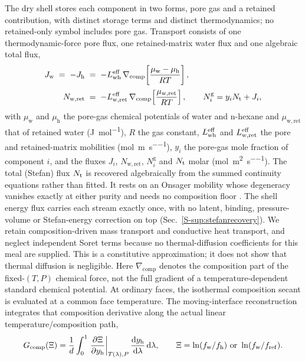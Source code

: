 The dry shell stores each component in two forms, pore gas and a retained
contribution, with distinct storage terms and distinct thermodynamics; no
retained-only symbol includes pore gas. Transport
consists of one thermodynamic-force pore flux, one retained-matrix water flux and one
algebraic total flux,
\begin{align}
J_{\mathrm{w}} \;=\; -J_{\mathrm{h}}
 &\;=\; -L_{\mathrm{wh}}^{\mathrm{eff}}\,\nabla_{\mathrm{comp}}\!\left[\frac{\mu_{\mathrm{w}}-\mu_{\mathrm{h}}}{RT}\right],
\label{eq:binaryflux}\\[2pt]
N_{\mathrm{w,ret}}
 &\;=\; -L_{\mathrm{w,ret}}^{\mathrm{eff}}\,\nabla_{\mathrm{comp}}\!\left[\frac{\mu_{\mathrm{w,ret}}}{RT}\right],
\qquad
N_{i}^{\mathrm{g}} = y_{i}N_{\mathrm{t}} + J_{i} ,
\label{eq:retflux}
\end{align}
with $\mu_{\mathrm{w}}$ and $\mu_{\mathrm{h}}$ the pore-gas chemical potentials
of water and n-hexane and $\mu_{\mathrm{w,ret}}$ that of retained water
(\si{\joule\per\mole}), $R$ the gas constant, $L_{\mathrm{wh}}^{\mathrm{eff}}$ and $L_{\mathrm{w,ret}}^{\mathrm{eff}}$ the pore and
retained-matrix mobilities (\si{\mole\per\meter\per\second}), $y_{i}$ the
pore-gas mole fraction of component $i$, and the fluxes $J_{i}$,
$N_{\mathrm{w,ret}}$, $N_{i}^{\mathrm{g}}$ and $N_{\mathrm{t}}$ molar
(\si{\mole\per\meter\squared\per\second}). The total (Stefan) flux $N_{\mathrm{t}}$ is recovered algebraically from the summed
continuity equations rather than fitted. It rests on an Onsager mobility whose
degeneracy vanishes exactly at either purity and needs no composition floor
\citep{krishna1997maxwell}. The shell energy flux carries each stream exactly
once, with no latent, binding, pressure-volume or Stefan-energy correction on
top (Sec.~\ref*{S-sup:stefanrecovery}). We retain composition-driven mass transport and conductive heat transport,
and neglect independent Soret terms because no thermal-diffusion
coefficients for this meal are supplied. This is a constitutive approximation;
it does not show that thermal diffusion is negligible. Here $\nabla_{\mathrm{comp}}$ denotes the composition part of the
fixed-$(T,P)$ chemical force, not the full gradient of a temperature-dependent
standard chemical potential. At ordinary faces, the isothermal
composition secant is evaluated at a common face temperature. The moving-interface
reconstruction integrates that composition derivative along the actual
linear temperature/composition path,
\begin{equation}
G_{\mathrm{comp}}(\Xi)=\frac{1}{d}\int_0^1
\left.\frac{\partial\Xi}{\partial y_{\mathrm h}}\right|_{T(\lambda),P}
\frac{\mathrm{d} y_{\mathrm h}}{\mathrm{d}\lambda}\,\mathrm{d}\lambda,
\qquad \Xi=\ln(f_{\mathrm w}/f_{\mathrm h})
\ \hbox{or}\ \ln(f_{\mathrm w}/f_{\mathrm{ref}}).
\label{eq:compositionforcepath}
\end{equation}
